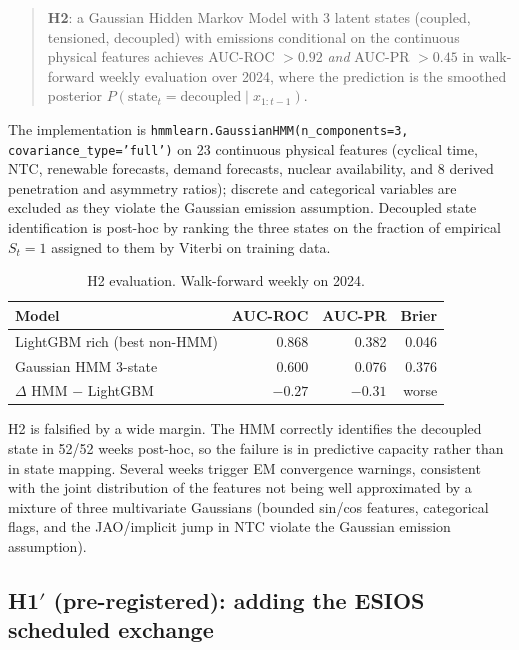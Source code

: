 \documentclass[11pt,a4paper]{article}
\begin{document}
\begin{quote}
\textbf{H2}: a Gaussian Hidden Markov Model with 3 latent states
({coupled, tensioned, decoupled}) with emissions conditional on the
continuous physical features achieves AUC-ROC $> 0.92$ \emph{and}
AUC-PR $> 0.45$ in walk-forward weekly evaluation over 2024,
where the prediction is the smoothed posterior
$P(\text{state}_t = \text{decoupled} \mid x_{1:t-1})$.
\end{quote}

The implementation is \texttt{hmmlearn.GaussianHMM(n\_components=3,
covariance\_type='full')} on 23 continuous physical features
(cyclical time, NTC, renewable forecasts, demand forecasts, nuclear
availability, and 8 derived penetration and asymmetry ratios);
discrete and categorical variables are excluded as they violate the
Gaussian emission assumption. Decoupled state identification is
post-hoc by ranking the three states on the fraction of empirical
$S_t = 1$ assigned to them by Viterbi on training data.

\begin{table}[H]
\centering
\small
\caption{H2 evaluation. Walk-forward weekly on 2024.}
\label{tab:h2}
\begin{tabular}{lrrr}
\toprule
\textbf{Model} & \textbf{AUC-ROC} & \textbf{AUC-PR} & \textbf{Brier} \\
\midrule
LightGBM rich (best non-HMM)          & 0.868 & 0.382 & 0.046 \\
Gaussian HMM 3-state                  & 0.600 & 0.076 & 0.376 \\
$\Delta$ HMM $-$ LightGBM             & $-0.27$ & $-0.31$ & worse \\
\bottomrule
\end{tabular}
\end{table}

H2 is falsified by a wide margin. The HMM correctly identifies the
decoupled state in 52/52 weeks post-hoc, so the failure is in
predictive capacity rather than in state mapping. Several weeks
trigger EM convergence warnings, consistent with the joint
distribution of the features not being well approximated by a
mixture of three multivariate Gaussians (bounded sin/cos features,
categorical flags, and the JAO/implicit jump in NTC violate the
Gaussian emission assumption).

\subsection{H1$'$ (pre-registered): adding the ESIOS scheduled
exchange}\label{sec:h1prime}
\end{document}
